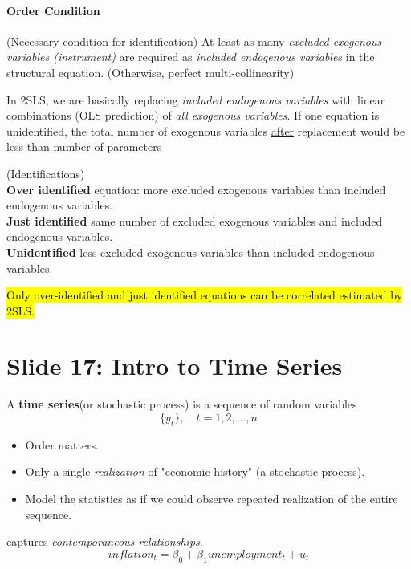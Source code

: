 \documentclass[]{article}
\begin{document}
			\paragraph{Order Condition}(Necessary condition for identification) At least as many \emph{excluded exogenous variables (instrument)} are required as \emph{included endogenous variables} in the structural equation. (Otherwise, perfect multi-collinearity)
			
			\begin{remark}
				In 2SLS, we are basically replacing \emph{included endogenous variables} with linear combinations (OLS prediction) of \emph{all exogenous variables}. If one equation is unidentified, the total number of exogenous variables \ul{after} replacement would be less than number of parameters
			\end{remark}
			\begin{definition} (Identifications) \\
				\textbf{Over identified} equation: more excluded exogenous variables than included endogenous variables. \\
				\textbf{Just identified} same number of excluded exogenous variables and included endogenous variables. \\
				\textbf{Unidentified} less excluded exogenous variables than included endogenous variables.
			\end{definition}
			\begin{remark}
				\hl{Only over-identified and just identified equations can be correlated estimated by 2SLS.}
			\end{remark}
	\section{Slide 17: Intro to Time Series}
		\begin{definition}
			A \textbf{time series}(or stochastic process) is a sequence of random variables
			\[
				\{y_t\},\quad t = 1,2,\dots,n
			\]
		\end{definition}
		\begin{itemize}
			\item Order matters.
			\item Only a single \emph{realization} of "economic history" (a stochastic process).
			\item Model the statistics as if we could observe repeated realization of the entire sequence.
		\end{itemize}
		
		\begin{example}
			captures \emph{contemporaneous relationships}.
			\[
				inflation_t = \beta_0 + \beta_1 unemployment_t + u_t
			\]
		\end{example}
		
\end{document}
